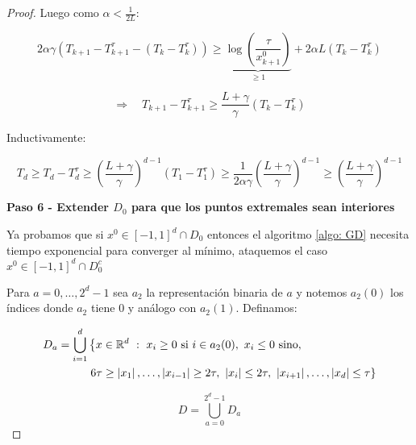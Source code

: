 \begin{proof}
	Luego como $\alpha < \frac{1}{2L}$:
	
	\begin{equation*}
	2 \alpha \gamma \left(T_{k+1} - T_{k+1}^{\tau} - \left(T_k - T_k^{\tau}\right)\right) \geq \underbrace{\log \left(\frac{\tau}{x_{k+1}^0}\right)}_{\geq 1} + 2 \alpha L\left(T_k - T_k^{\tau}\right)
	\end{equation*}
	
	\begin{equation*}
		\Rightarrow \quad T_{k+1} - T_{k+1}^{\tau} \geq \dfrac{L + \gamma}{\gamma} \left(T_k - T_k^{\tau}\right)
	\end{equation*}
	
	Inductivamente:
	
	\begin{equation}
		T_d \geq T_d - T_d^{\tau} \geq \left(\dfrac{L+\gamma}{\gamma}\right)^{d-1} \left(T_1 - T_1^{\tau}\right) \geq \dfrac{1}{2 \alpha \gamma}  \left(\dfrac{L+\gamma}{\gamma}\right)^{d-1}  \geq \left(\dfrac{L+\gamma}{\gamma}\right)^{d-1} 
	\end{equation}
	
	\medskip
	
	\textbf{Paso 6 - Extender $D_0$ para que los puntos extremales sean interiores}
	
	\medskip
	
	Ya probamos que si $x^0 \in [-1,1]^d \cap D_0$ entonces el algoritmo \ref{algo: GD} necesita tiempo exponencial para converger al m\'inimo, ataquemos el caso $x^0 \in [-1,1]^d \cap D_0^c$
	
	Para $a=0, \dots, 2^d -1$ sea $a_2$ la representaci\'on binaria de $a$ y notemos $a_2(0)$ los \'indices donde $a_2$ tiene $0$ y an\'alogo con $a_2(1)$. Definamos:
	
	\begin{equation*}
	\begin{split}
		D_a = \bigcup\limits_{i=1}^{d} & \left\lbrace x \in {\mathbb{R}}^d ~:~ x_i \geq 0 \text{ si } i \in a_2(0), \ x_i \leq 0 \text{ sino}, \right. \\
			&  \left. 6\tau \geq \left\lvert x_1\right\rvert, \dots, \left\lvert x_{i-1}\right\rvert \geq 2\tau,\ \left\lvert x_i\right\rvert \leq 2\tau,\ \left\lvert x_{i+1}\right\rvert, \dots, \left\lvert x_d\right\rvert \leq \tau \right\rbrace
	\end{split}
	\end{equation*}
	
	\begin{equation*}
		D = \bigcup\limits_{a = 0}^{2^d -1} {D_a}
	\end{equation*}
	

\end{proof}
